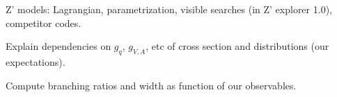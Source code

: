 Z' models: Lagrangian, parametrization, visible searches (in Z' explorer 1.0), competitor codes.

Explain dependencies on $g_q$, $g_{V,A}$, etc of cross section and distributions (our expectations).

Compute branching ratios and width as function of our observables. 
